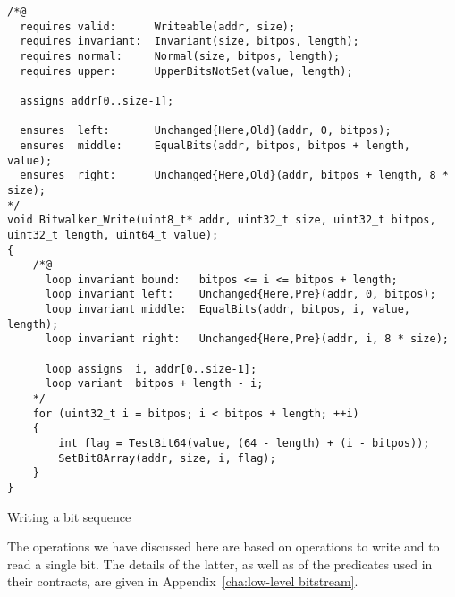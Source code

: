 \begin{listing}[hbt]
\begin{minipage}{0.99\textwidth}
\begin{lstlisting}[style=acsl-block]
/*@
  requires valid:      Writeable(addr, size);
  requires invariant:  Invariant(size, bitpos, length);
  requires normal:     Normal(size, bitpos, length);
  requires upper:      UpperBitsNotSet(value, length);

  assigns addr[0..size-1];

  ensures  left:       Unchanged{Here,Old}(addr, 0, bitpos);
  ensures  middle:     EqualBits(addr, bitpos, bitpos + length, value);
  ensures  right:      Unchanged{Here,Old}(addr, bitpos + length, 8 * size);
*/
void Bitwalker_Write(uint8_t* addr, uint32_t size, uint32_t bitpos, uint32_t length, uint64_t value);
{
    /*@
      loop invariant bound:   bitpos <= i <= bitpos + length;
      loop invariant left:    Unchanged{Here,Pre}(addr, 0, bitpos);
      loop invariant middle:  EqualBits(addr, bitpos, i, value, length);
      loop invariant right:   Unchanged{Here,Pre}(addr, i, 8 * size);

      loop assigns  i, addr[0..size-1];
      loop variant  bitpos + length - i;
    */
    for (uint32_t i = bitpos; i < bitpos + length; ++i)
    {
        int flag = TestBit64(value, (64 - length) + (i - bitpos));
        SetBit8Array(addr, size, i, flag);
    }   
}

\end{lstlisting}
\end{minipage}
\caption{\label{Bitwalker_Write spec}Writing a bit sequence}
\end{listing}

The operations we have discussed here are based
on operations to write and to read a single bit.
%
The details of the latter, as well as of the predicates used in their
contracts, are given in Appendix~\ref{cha:low-level bitstream}.






